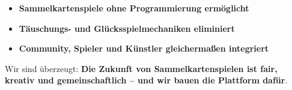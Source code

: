 \documentclass[fontsize=12]{scrartcl}
\begin{document}
	\begin{itemize}
		
		\item \textbf{Sammelkartenspiele ohne Programmierung ermöglicht}
		
		\item \textbf{Täuschungs- und Glücksspielmechaniken eliminiert}
		
		\item \textbf{Community, Spieler und Künstler gleichermaßen integriert}
		
	\end{itemize}
	
	Wir sind überzeugt: \textbf{Die Zukunft von Sammelkartenspielen ist fair, kreativ und gemeinschaftlich -- und wir bauen die Plattform dafür}.
	
	
	
\end{document}
